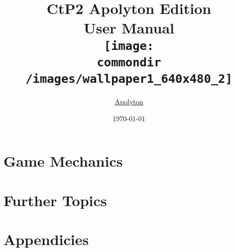 \documentclass[a4paper,openany]{book}
\newcommand{\commondir}{../../common}
\newcommand{\apolytonlink}{%
	\href{http://apolyton.net/forums/forumdisplay.php?s=\&forumid=213}{Apolyton}%
}
\begin{document}
\title{CtP2 Apolyton Edition\\[5mm]
User Manual\\[20mm]
\texttt{[image: \\commondir /images/wallpaper1\_640x480\_2]}\\[5mm]}
\author{\apolytonlink}
\date{\today}
\maketitle
\thispagestyle{empty}
\tableofcontents

\setlength{\parindent}{0pt}
\setlength{\parskip}{1.5ex plus 0.5ex minus 0.5ex}




\part[Game Mechanics]{Game Mechanics%
	\thispagestyle{empty}\label{part:gameMechanics}}








\part[Further Topics]{Further Topics%
	\thispagestyle{empty}\label{part:furtherTopics}}







\part[Appendicies]{Appendicies%
	\thispagestyle{empty}\label{part:Appendicies}}
\appendix












\clearpage
{}
\label{chap:index}
\printindex
\end{document}
